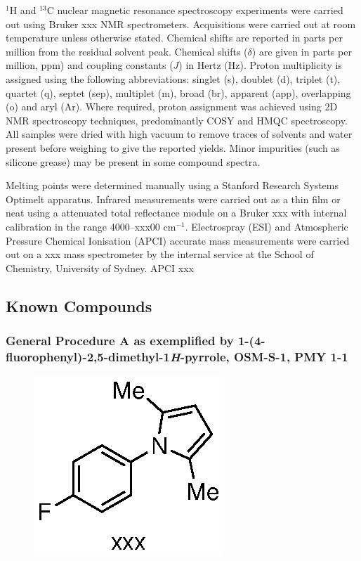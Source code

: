 \documentclass[12pt, a4paper,titlepage]{article}
\begin{document}
$^1$H and $^{13}$C nuclear magnetic resonance spectroscopy experiments were carried out using Bruker xxx  NMR spectrometers. Acquisitions were carried out at room temperature unless otherwise stated. Chemical shifts are reported in parts per million from the residual solvent peak. Chemical shifts ($\delta$) are given in parts per million, ppm) and coupling constants ($J$) in Hertz (Hz). Proton multiplicity is assigned using the following abbreviations: singlet (s), doublet (d), triplet (t), quartet (q), septet (sep), multiplet (m), broad (br), apparent (app), overlapping (o) and aryl (Ar). Where required, proton assignment was achieved using 2D NMR spectroscopy techniques, predominantly COSY and HMQC spectroscopy. All samples were dried with high vacuum to remove traces of solvents and water present before weighing to give the reported yields. Minor impurities (such as silicone grease) may be present in some compound spectra. 

Melting points were determined manually using a Stanford Research Systems Optimelt apparatus. Infrared measurements were carried out as a thin film or neat using a attenuated total reflectance module on a Bruker xxx with internal calibration in the range 4000--xxx00 cm$^{-1}$. Electrospray (ESI) and Atmospheric Pressure Chemical Ionisation (APCI) accurate mass measurements were carried out on a xxx mass spectrometer by the internal service at the School of Chemistry, University of Sydney. APCI xxx 


\subsection{Known Compounds}

\subsubsection*{General Procedure A as exemplified by 1-(4-fluorophenyl)-2,5-dimethyl-1\emph{H}-pyrrole, OSM-S-1, PMY 1-1}
\label{exp:PMY1}
	\begin{figure}[H]
	\begin{center}
	\includegraphics{exp/PMY1.eps}
	\end{center}
	\vspace{-25pt}	
	\end{figure}	
\end{document}
